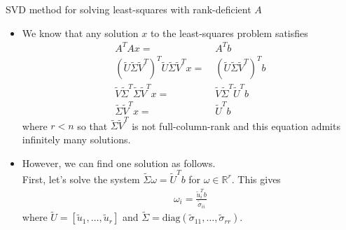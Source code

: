 \documentclass[t,usepdftitle=false]{beamer}
\begin{document}
\begin{frame}{SVD method for solving least-squares with rank-deficient $A$}
\begin{itemize}
\item We know that any solution $x$ to the least-squares problem satisfies
\begin{align*}
A^TAx=&\;A^Tb\\
(\widetilde{U}\widetilde{\Sigma}\widetilde{V}^T)^T\widetilde{U}\widetilde{\Sigma}\widetilde{V}^Tx=&\;(\widetilde{U}\widetilde{\Sigma}\widetilde{V}^T)^Tb\\
\widetilde{V}\widetilde{\Sigma}^T\widetilde{\Sigma}\widetilde{V}^Tx=&\;\widetilde{V}\widetilde{\Sigma}^T\widetilde{U}^Tb\\
\widetilde{\Sigma}\widetilde{V}^Tx=&\;\widetilde{U}^Tb
\end{align*}
where $r<n$ so that $\widetilde{\Sigma}\widetilde{V}^T$ is not full-column-rank and this equation admits infinitely many solutions.
\item However, we can find one solution as follows.\vspace{.1cm}\\
First, let's solve the system $\widetilde{\Sigma}\omega=\widetilde{U}^Tb$ for $\omega\in\mathbb{R}^r$. This gives
\begin{align*}
\omega_i=\frac{\widetilde{u}_i^Tb}{\widetilde{\sigma}_{ii}}
\end{align*}
where $\widetilde{U}=[\widetilde{u}_1,\dots,\widetilde{u}_r]$ and $\widetilde{\Sigma}=\mathrm{diag}(\widetilde{\sigma}_{11},\dots,\widetilde{\sigma}_{rr})$.
\end{itemize}
\end{frame}
\end{document}
